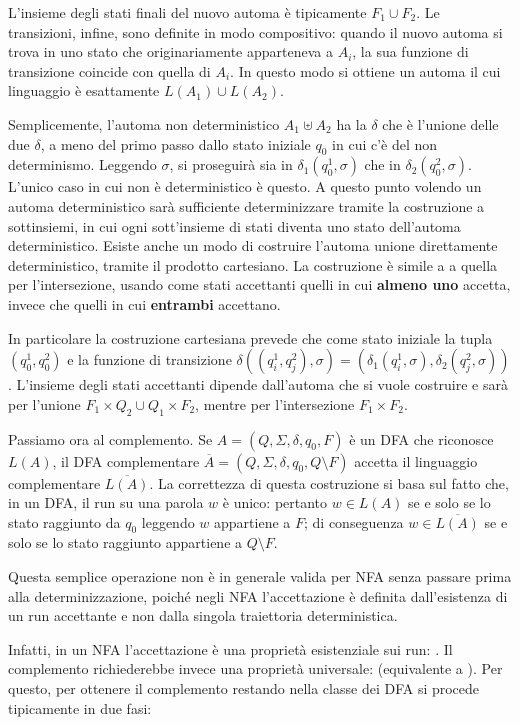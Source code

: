L'insieme degli stati finali del nuovo automa è tipicamente \(F_1\cup F_2\). Le transizioni, infine, sono definite in modo compositivo: quando il nuovo automa si trova in uno stato che originariamente apparteneva a \(A_i\), la sua funzione di transizione coincide con quella di \(A_i\). In questo modo si ottiene un automa il cui linguaggio è esattamente \(L(A_1)\cup L(A_2)\).


Semplicemente, l'automa non deterministico \(A_1 \uplus A_2\) ha la \(\delta\) che è l'unione delle due \(\delta\), a meno del primo passo dallo stato iniziale \(q_0\) in cui c'è del non determinismo. Leggendo \(\sigma\), si proseguirà sia in \(\delta_1(q_0^1, \sigma)\) che in \(\delta_2(q_0^2, \sigma)\). L'unico caso in cui non è deterministico è questo. A questo punto volendo un automa deterministico sarà sufficiente determinizzare tramite la costruzione a sottinsiemi, in cui ogni sott'insieme di stati diventa uno stato dell'automa deterministico. Esiste anche un modo di costruire l'automa unione direttamente deterministico, tramite il prodotto cartesiano. La costruzione è simile a a quella per l'intersezione, usando come stati accettanti quelli in cui \textbf{almeno uno} accetta, invece che quelli in cui \textbf{entrambi} accettano. 

In particolare la costruzione cartesiana prevede che come stato iniziale la tupla \((q^1_0, q^2_0)\) e la funzione di transizione \(\delta((q^1_i, q^2_j), \sigma) = (\delta_1(q^1_i, \sigma), \delta_2(q^2_j, \sigma))\). L'insieme degli stati accettanti dipende dall'automa che si vuole costruire e sarà per l'unione \(F_1\times Q_2 \cup Q_1\times F_2\), mentre per l'intersezione \(F_1 \times F_2\).

Passiamo ora al complemento. Se \(A=(Q,\Sigma,\delta,q_0,F)\) è un DFA che riconosce \(L(A)\), il DFA complementare \(\overline{A}=(Q,\Sigma,\delta,q_0,Q\setminus F)\) accetta il linguaggio complementare \(\overline{L(A)}\). La correttezza di questa costruzione si basa sul fatto che, in un DFA, il run su una parola \(w\) è unico: pertanto \(w\in L(A)\) se e solo se lo stato raggiunto da \(q_0\) leggendo \(w\) appartiene a \(F\); di conseguenza \(w\in\overline{L(A)}\) se e solo se lo stato raggiunto appartiene a \(Q\setminus F\).

Questa semplice operazione non è in generale valida per NFA senza passare prima alla determinizzazione, poiché negli NFA l'accettazione è definita dall'esistenza di un run accettante e non dalla singola traiettoria deterministica.

Infatti, in un NFA l'accettazione è una proprietà esistenziale sui run: . Il complemento richiederebbe invece una proprietà universale:  (equivalente a ). Per questo, per ottenere il complemento restando nella classe dei DFA si procede tipicamente in due fasi:


